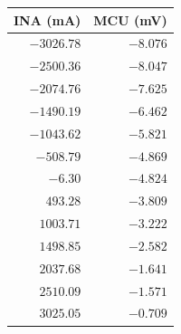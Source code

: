 \documentclass[12pt,a4paper]{article}
\begin{document}
\begin{figure}[H]
    \centering
    
    \begin{minipage}[c]{0.40\textwidth}
        \centering
        \label{tab:naive-sat-before}
        \small 
        \begin{tabular}{@{}rr@{}}
            \toprule
            INA (mA) & MCU (mV) \\
            \midrule
            $-3026.78$ & $-8.076$ \\
            $-2500.36$ & $-8.047$ \\
            $-2074.76$ & $-7.625$ \\
            $-1490.19$ & $-6.462$ \\
            $-1043.62$ & $-5.821$ \\
            $-508.79$  & $-4.869$ \\
            $-6.30$    & $-4.824$ \\
            $493.28$   & $-3.809$ \\
            $1003.71$  & $-3.222$ \\
            $1498.85$  & $-2.582$ \\
            $2037.68$  & $-1.641$ \\
            $2510.09$  & $-1.571$ \\
            $3025.05$  & $-0.709$ \\
            \bottomrule
        \end{tabular}
        
        \vspace{1.5cm} 
        

\end{minipage}
\end{figure}
\end{document}
